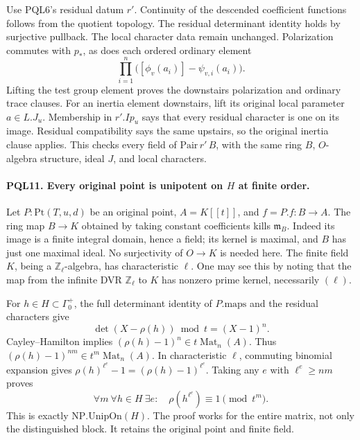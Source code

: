 Use PQL6's residual datum \(r'\).
Continuity of the descended coefficient functions follows
from the quotient topology. The residual determinant
identity holds by surjective pullback. The local
character data remain unchanged. Polarization commutes
with \(p_*\), as does each ordered ordinary element
\[
 \prod_{i=1}^n
       \bigl([\phi_v(a_i)]-\psi_{v,i}(a_i)\bigr).    \tag{PQL.19}
\]
Lifting the test group element proves the downstairs
polarization and ordinary trace clauses.
For an inertia element downstairs, lift its original
local parameter \(a\in L.J_u\). Membership in \(r'.Ip_u\)
says that every residual character is one on its image.
Residual compatibility says the same upstairs, so the
original inertia clause applies. This checks every field
of \(\mathrm{Pair}\,r'\,B\), with the same ring \(B\),
\(O\)-algebra structure, ideal \(J\), and local characters.

\paragraph{PQL11. Every original point is unipotent on \(H\) at finite order.}
\label{claim:PQL11}
Let \(P:\mathrm{Pt}(T,u,d)\) be an original point,
\(A=K[[t]]\), and \(f=P.f:B\to A\).
The ring map \(B\to K\) obtained by taking constant
coefficients kills \(\mathfrak m_B\). Indeed its image is
a finite integral domain, hence a field; its kernel is
maximal, and \(B\) has just one maximal ideal.
No surjectivity of \(O\to K\) is needed here.
The finite field \(K\), being a \(\mathbb Z_\ell\)-algebra,
has characteristic \(\ell\). One may see this by noting
that the map from the infinite DVR \(\mathbb Z_\ell\)
to \(K\) has nonzero prime kernel, necessarily \((\ell)\).

For \(h\in H\subset\Gamma_0^+\), the full determinant
identity of \(P.\mathrm{maps}\) and the residual characters
give
\[
 \det(X-\rho(h))\bmod t=(X-1)^n.                    \tag{PQL.20}
\]
Cayley--Hamilton implies \((\rho(h)-1)^n\in
t\operatorname{Mat}_n(A)\). Thus
\((\rho(h)-1)^{nm}\in t^m\operatorname{Mat}_n(A)\).
In characteristic \(\ell\), commuting binomial expansion
gives
\(\rho(h)^{\ell^e}-1=(\rho(h)-1)^{\ell^e}\).
Taking any \(e\) with \(\ell^e\geq nm\) proves
\[
 \forall m\ \forall h\in H\ \exists e:\quad
      \rho(h^{\ell^e})\equiv1\pmod{t^m}.           \tag{PQL.21}
\]
This is exactly \(\mathrm{NP.UnipOn}(H)\). The proof
works for the entire matrix, not only the distinguished
block. It retains the original point and finite field.


